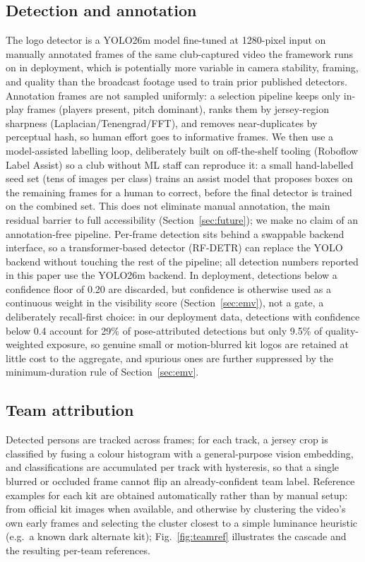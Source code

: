 \documentclass[conference,a4paper]{IEEEtran}
\begin{document}
\subsection{Detection and annotation}
The logo detector is a YOLO26m model fine-tuned at 1280-pixel input on manually
annotated frames of the same club-captured video the framework runs on in deployment,
which is potentially more variable in camera stability, framing, and quality than the
broadcast footage used to train prior published detectors. Annotation frames are not
sampled uniformly: a selection pipeline keeps only in-play frames (players present,
pitch dominant), ranks them by jersey-region sharpness (Laplacian/Tenengrad/FFT), and
removes near-duplicates by perceptual hash, so human effort goes to informative frames.
We then use a model-assisted labelling loop, deliberately built on off-the-shelf tooling
(Roboflow Label Assist) so a club without ML staff can reproduce it: a small hand-labelled
seed set (tens of images per class) trains an assist model that proposes boxes on the
remaining frames for a human to correct, before the final detector is trained on the
combined set. This does not eliminate manual annotation, the main
residual barrier to full accessibility (Section~\ref{sec:future}); we make no claim of
an annotation-free pipeline. Per-frame detection sits behind a swappable
backend interface, so a transformer-based detector (RF-DETR) can replace the YOLO
backend without touching the rest of the pipeline; all detection numbers reported in
this paper use the YOLO26m backend. In deployment, detections below a confidence
floor of 0.20 are discarded, but confidence is otherwise used as a continuous weight
in the visibility score (Section~\ref{sec:emv}), not a gate, a deliberately
recall-first choice: in our deployment data, detections with confidence below 0.4
account for 29\% of pose-attributed detections but only 9.5\% of quality-weighted
exposure, so genuine small or motion-blurred kit logos are retained at little cost to
the aggregate, and spurious ones are further suppressed by the minimum-duration rule
of Section~\ref{sec:emv}.

\subsection{Team attribution}
\label{sec:teamfilter}
Detected persons are tracked across frames; for each track, a jersey crop is classified
by fusing a colour histogram with a general-purpose vision embedding, and
classifications are accumulated per track with hysteresis, so that a single blurred or
occluded frame cannot flip an already-confident team label. Reference examples for each
kit are obtained automatically rather than by manual setup: from official kit images
when available, and otherwise by clustering the video's own early frames and selecting
the cluster closest to a simple luminance heuristic (e.g.\ a known dark alternate kit);
Fig.~\ref{fig:teamref} illustrates the cascade and the resulting per-team references.
\end{document}
